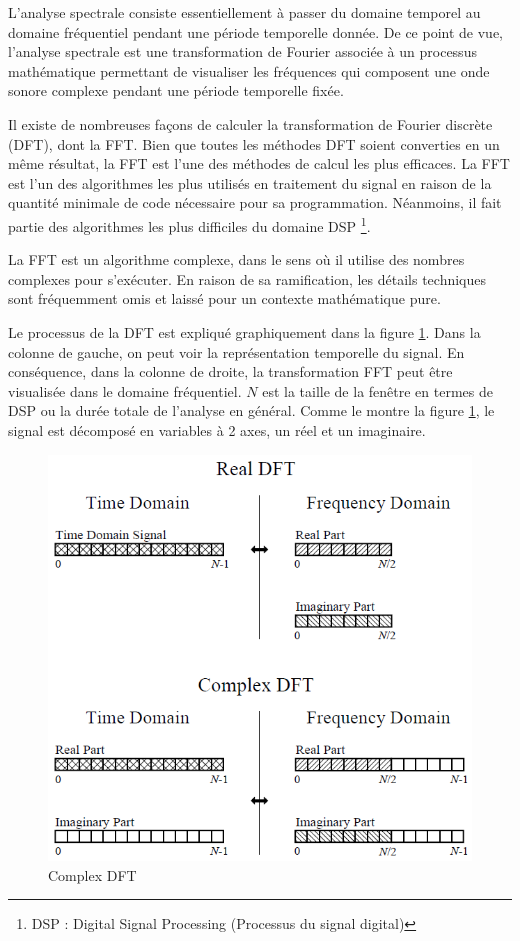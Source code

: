 L’analyse spectrale consiste essentiellement à passer du domaine temporel au domaine fréquentiel pendant une période temporelle donnée. De ce point de vue, l’analyse spectrale est une transformation de Fourier associée à un processus mathématique permettant de visualiser les fréquences qui composent une onde sonore complexe pendant une période temporelle fixée.

Il existe de nombreuses façons de calculer la transformation de Fourier discrète (DFT), dont la FFT. Bien que toutes les méthodes DFT soient converties en un même résultat, la FFT est l’une des méthodes de calcul les plus efficaces. La FFT est l’un des algorithmes les plus utilisés en traitement du signal en raison de la quantité minimale de code nécessaire pour sa programmation. Néanmoins, il fait partie des algorithmes les plus difficiles du domaine DSP \footnote{DSP : Digital Signal Processing (Processus du signal digital)}.

La FFT est un algorithme complexe, dans le sens où il utilise des nombres complexes pour s'exécuter. En raison de sa ramification, les détails techniques sont fréquemment omis et laissé pour un contexte mathématique pure.

Le processus de la DFT est expliqué graphiquement dans la figure \ref{ComplexDFT}. Dans la colonne de gauche, on peut voir la représentation temporelle du signal. En conséquence, dans la colonne de droite, la transformation FFT peut être visualisée dans le domaine fréquentiel. $ N $ est la taille de la fenêtre en termes de DSP ou la durée totale de l'analyse en général. Comme le montre la figure \ref{ComplexDFT}, le signal est décomposé en variables à 2 axes, un réel et un imaginaire.

\begin{figure}
    \centering
    \includegraphics[width = 0.5 \textwidth ]{Graphs/ComplexDFT.png}
    \caption{Complex DFT}
    \label{ComplexDFT}
\end{figure}

